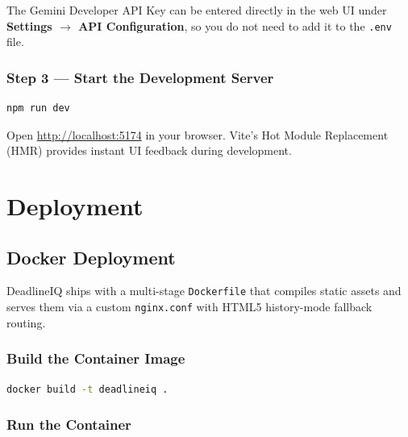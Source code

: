 \documentclass[12pt,a4paper]{report}
\begin{document}
\begin{tcolorbox}[infobox, title={Tip — Gemini API Key}]
The Gemini Developer API Key can be entered directly in the web UI under \textbf{Settings $\rightarrow$ API Configuration}, so you do not need to add it to the \texttt{.env} file.
\end{tcolorbox}

\subsection{Step 3 — Start the Development Server}

\begin{tcolorbox}[codebox]
\begin{lstlisting}[language=bash]
npm run dev
\end{lstlisting}
\end{tcolorbox}

Open \url{http://localhost:5174} in your browser. Vite's Hot Module Replacement (HMR) provides instant UI feedback during development.

\chapter{Deployment}
\label{ch:deploy}

\section{Docker Deployment}

DeadlineIQ ships with a multi-stage \texttt{Dockerfile} that compiles static assets and serves them via a custom \texttt{nginx.conf} with HTML5 history-mode fallback routing.

\subsection{Build the Container Image}

\begin{tcolorbox}[codebox]
\begin{lstlisting}[language=bash]
docker build -t deadlineiq .
\end{lstlisting}
\end{tcolorbox}

\subsection{Run the Container}
\end{document}

